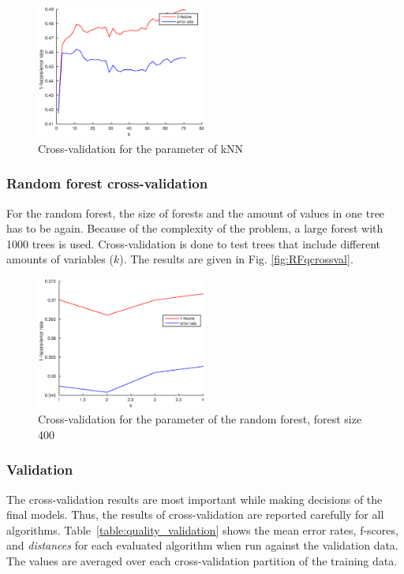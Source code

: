 \documentclass[twoside]{article}
\begin{document}
\begin{multicols}{2}
\begin{figure}[H]
\centering
\includegraphics[width=0.5\textwidth]{knnqcrossval}
\caption{Cross-validation for the parameter of kNN}
\label{fig:knnqcrossval}
\end{figure}

\subsubsection{Random forest cross-validation}

For the random forest, the size of forests and the amount of values in one tree has to be again.
Because of the complexity of the problem, a large forest with 1000 trees is used. Cross-validation
is done to test trees that include different amounts of variables ($k$). The results are given in Fig. 
\ref{fig:RFqcrossval}.

\begin{figure}[H]
\centering
\includegraphics[width=0.5\textwidth]{RFqcrossval}
\caption{Cross-validation for the parameter of the random forest, forest size 400}
\label{fig:RFq1000crossval}
\end{figure}

\subsubsection{Validation}

The cross-validation results are most important while making decisions of the final models. Thus, the results of cross-validation are reported carefully for all algorithms.
Table~\ref{table:quality_validation} shows the mean error rates, f-scores, and \emph{distances} for each evaluated algorithm when run against the validation data. The values are averaged over each
cross-validation partition of the training data.


\end{multicols}
\end{document}
